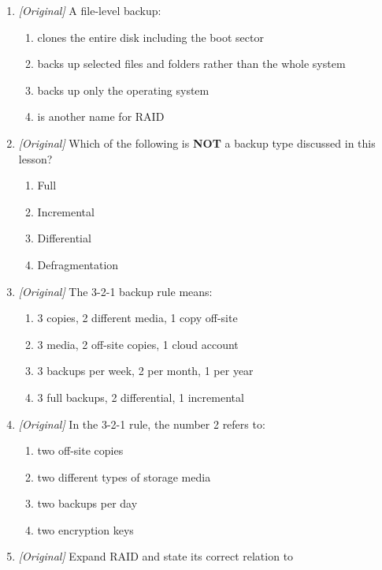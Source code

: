 \begin{enumerate}[label=\textbf{Q\arabic*.}, leftmargin=*]
\begin{enumerate}[label=\Alph*.]
    \item a copy of changes since the last full backup
    \item a copy of only the most recently deleted files
  \end{enumerate}
\item \textit{[Original]} A file-level backup:
  \begin{enumerate}[label=\Alph*.]
    \item clones the entire disk including the boot sector
    \item backs up selected files and folders rather than the whole system
    \item backs up only the operating system
    \item is another name for RAID
  \end{enumerate}
\item \textit{[Original]} Which of the following is \textbf{NOT} a backup
  type discussed in this lesson?
  \begin{enumerate}[label=\Alph*.]
    \item Full
    \item Incremental
    \item Differential
    \item Defragmentation
  \end{enumerate}
\item \textit{[Original]} The 3-2-1 backup rule means:
  \begin{enumerate}[label=\Alph*.]
    \item 3 copies, 2 different media, 1 copy off-site
    \item 3 media, 2 off-site copies, 1 cloud account
    \item 3 backups per week, 2 per month, 1 per year
    \item 3 full backups, 2 differential, 1 incremental
  \end{enumerate}
\item \textit{[Original]} In the 3-2-1 rule, the number 2 refers to:
  \begin{enumerate}[label=\Alph*.]
    \item two off-site copies
    \item two different types of storage media
    \item two backups per day
    \item two encryption keys
  \end{enumerate}
\item \textit{[Original]} Expand RAID and state its correct relation to

\end{enumerate}

